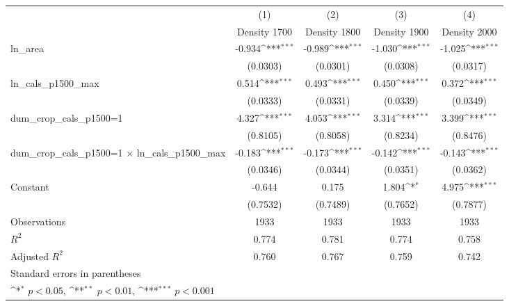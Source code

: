 {
\def\sym#1{\ifmmode^{#1}\else\(^{#1}\)\fi}
\begin{tabular}{l*{4}{c}}
\toprule
                    &\multicolumn{1}{c}{(1)}&\multicolumn{1}{c}{(2)}&\multicolumn{1}{c}{(3)}&\multicolumn{1}{c}{(4)}\\
                    &\multicolumn{1}{c}{Density 1700}&\multicolumn{1}{c}{Density 1800}&\multicolumn{1}{c}{Density 1900}&\multicolumn{1}{c}{Density 2000}\\
\midrule
ln\_area             &      -0.934\sym{***}&      -0.989\sym{***}&      -1.030\sym{***}&      -1.025\sym{***}\\
                    &    (0.0303)         &    (0.0301)         &    (0.0308)         &    (0.0317)         \\
\addlinespace
ln\_cals\_p1500\_max   &       0.514\sym{***}&       0.493\sym{***}&       0.450\sym{***}&       0.372\sym{***}\\
                    &    (0.0333)         &    (0.0331)         &    (0.0339)         &    (0.0349)         \\
\addlinespace
dum\_crop\_cals\_p1500=1&       4.327\sym{***}&       4.053\sym{***}&       3.314\sym{***}&       3.399\sym{***}\\
                    &    (0.8105)         &    (0.8058)         &    (0.8234)         &    (0.8476)         \\
\addlinespace
dum\_crop\_cals\_p1500=1 $\times$ ln\_cals\_p1500\_max&      -0.183\sym{***}&      -0.173\sym{***}&      -0.142\sym{***}&      -0.143\sym{***}\\
                    &    (0.0346)         &    (0.0344)         &    (0.0351)         &    (0.0362)         \\
\addlinespace
Constant            &      -0.644         &       0.175         &       1.804\sym{*}  &       4.975\sym{***}\\
                    &    (0.7532)         &    (0.7489)         &    (0.7652)         &    (0.7877)         \\
\midrule
Observations        &        1933         &        1933         &        1933         &        1933         \\
\(R^{2}\)           &       0.774         &       0.781         &       0.774         &       0.758         \\
Adjusted \(R^{2}\)  &       0.760         &       0.767         &       0.759         &       0.742         \\
\bottomrule
\multicolumn{5}{l}{\footnotesize Standard errors in parentheses}\\
\multicolumn{5}{l}{\footnotesize \sym{*} \(p<0.05\), \sym{**} \(p<0.01\), \sym{***} \(p<0.001\)}\\
\end{tabular}
}

